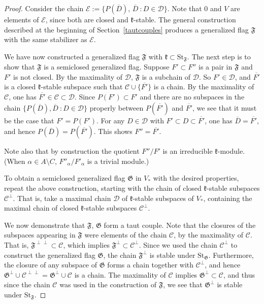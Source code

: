 \documentclass{article}
\newcommand {\St} {\mathrm{St}}
\def\k{\mathfrak{k}}
\def\F{\mathfrak{F}}
\def\G{\mathfrak{G}}
\def\Ch{\mathcal{C}}
\def\Dh{\mathcal{D}}
\def\Eh{\mathcal{E}}
\begin{document}
\begin{proof}
Consider the chain $\Eh := \{P(\overline{D}), \, \overline D  ~\colon  D \in \Dh\}$.  Note that $0$ and $V$ are elements of $\Eh$, since both are closed and $\k$-stable.  The general construction described at the beginning of Section~\ref{tautcouples} produces a generalized flag $\F$ with the same stabilizer as $\Eh$.

We have now constructed a generalized flag $\F$ with $\k \subset \St_\F$.  The next step is to show that $\F$ is a semiclosed generalized flag.  Suppose $F' \subset F''$ is a pair in $\F$ and $F'$ is not closed.  By the maximality of $\Dh$, $\F$ is a subchain of $\Dh$.  So $F' \in \Dh$, and 
$\overline{F'}$ is a closed $\k$-stable subspace such that $\Ch \cup \{ \overline{F'} \}$ is a chain.  By the maximality of $\Ch$, one has $\overline{F'} \in \Ch \subset \Dh$.  Since $P(F') \subset F'$ and there are no subspaces in the chain $\{ P(\overline{D}), \overline D ~\colon D \in \Dh \}$ properly between $P(\overline{F'})$ and $\overline{F'}$, we see that it must be the case that $F' = P(F')$.  For any $D \in \Dh$ with $F' \subset D \subset \overline{F'}$, one has $\overline{D} = \overline{F'}$, and hence $P(\overline{D}) = P(\overline{F'})$.  This shows $F'' = \overline{F'}$.

Note also that by construction the quotient $F'' / F'$ is an irreducible $\k$-module.  (When $\alpha \in A \setminus C$, ${F''_\alpha} / {F'_\alpha} $ is a trivial module.)

To obtain a semiclosed generalized flag $\G$ in $V_*$ with the desired properties, repeat the above construction, starting with the chain of closed $\k$-stable subspaces $\Ch^\perp$.  That is, take a maximal chain $\Dh$ of $\k$-stable subspaces of $V_*$, containing the maximal chain of closed $\k$-stable subspaces $\Ch^\perp$.  

We now demonstrate that $\F$, $\G$ form a taut couple.  Note that the closures of the subspaces appearing in $\F$ were elements of the chain $\Ch$, by the maximality of $\Ch$.  That is, $\F^{\perp \perp} \subset \Ch$, which implies $\F^{\perp} \subset \Ch^\perp$.  Since we used the chain $\Ch^\perp$ to construct the generalized flag $\G$, the chain $\F^\perp$ is stable under $\St_\G$.  Furthermore, the closure of any subspace of $\G$ forms a chain together with $\Ch^\perp$, and hence $\G^\perp \cup \Ch^{\perp \perp} = \G^\perp \cup \Ch$ is a chain.  The maximality of $\Ch$ implies $\G^\perp \subset \Ch$, and thus since the chain $\Ch$ was used in the construction of $\F$, we see that $\G^\perp$ is stable under $\St_\F$.


\end{proof}
\end{document}
